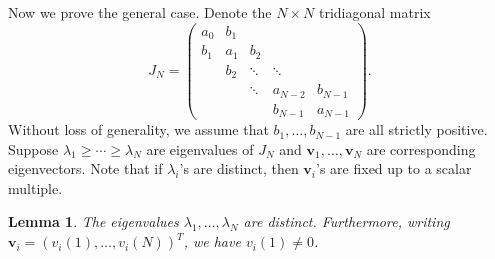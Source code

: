\documentclass[11pt, a4paper]{article}
\numberwithin{equation}{section}
\renewcommand{\vec}[1]{\mathbf{#1}}
\newtheorem{lem}{Lemma}
\theoremstyle{definition}
\theoremstyle{remark}
\begin{document}
Now we prove the general case. Denote the $N \times N$ tridiagonal matrix
\begin{equation} \label{eq:J_N}
  J_N =
  \begin{pmatrix}
    a_0 & b_1 & & & \\
    b_1 & a_1 & b_2 & & \\
     & b_2 & \ddots & \ddots & \\
     & & \ddots & a_{N - 2} & b_{N - 1} \\
     & & & b_{N - 1} & a_{N - 1}
  \end{pmatrix}.
\end{equation}
Without loss of generality, we assume that $b_1, \dotsc, b_{N - 1}$ are all strictly positive. Suppose $\lambda_1 \geq \dotsb \geq \lambda_N$ are eigenvalues of $J_N$ and $\vec{v}_1, \dotsc, \vec{v}_N$ are corresponding eigenvectors. Note that if $\lambda_i$'s are distinct, then $\vec{v}_i$'s are fixed up to a scalar multiple.
\begin{lem} \label{lem:distinct_eigenvalue_H_N}
  The eigenvalues $\lambda_1, \dots, \lambda_N$ are distinct. Furthermore, writing $\vec{v}_i = (v_i(1), \dotsc, v_i(N))^T$, we have $v_i(1) \neq 0$.
\end{lem}
\end{document}
